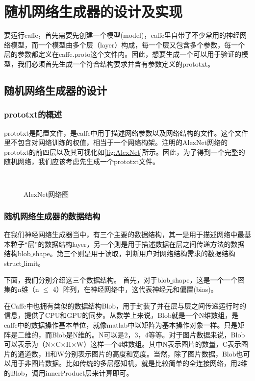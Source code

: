 ﻿\chapter{随机网络生成器的设计及实现}
要运行caffe，首先需要先创建一个模型(model)，caffe里自带了不少常用的神经网络模型，而一个模型由多个层（layer）构成，每一个层又包含多个参数，每一个层的参数都定义在caffe.proto这个文件内。因此，想要生成一个可以用于验证的模型，我们必须首先生成一个符合结构要求并含有参数定义的prototxt。
\section{随机网络生成器的设计}
\subsection{prototxt的概述}
prototxt是配置文件，是caffe中用于描述网络参数以及网络结构的文件。这个文件里不包含对网络训练的权值，相当于一个网络构架。注明的AlexNet网络的prototxt的前四层以及其可视化如\autoref{fig:AlexNet}所示。因此，为了得到一个完整的随机网络，我们应该考虑先生成一个prototxt文件。

\begin{figure}[!htbp]
\centering 
{}
\\
\caption{AlexNet网络图}
\label{fig:AlexNet}
\end{figure}

\subsection{随机网络生成器的数据结构}
在我们神经网络生成器当中，有三个主要的数据结构，其一是用于描述网络中最基本粒子“层”的数据结构layer，另一个则是用于描述数据在层之间传递方法的数据结构blob\underline{ }shape。第三个则是用于读取，判断用户对网络结构需求的数据结构struct\underline{ }limit。

下面，我们分别介绍这三个数据结构。
首先，对于blob\underline{ }shape，这是一个一个密集的n维（n $\leq$ 4）阵列，在神经网络中，这代表神经元和偏置(bias)。

在Caffe中也拥有类似的数据结构Blob，用于封装了并在层与层之间传递运行时的信息，提供了CPU和GPU的同步。从数学上来说，Blob就是一个N维数组，是caffe中的数据操作基本单位，就像matlab中以矩阵为基本操作对象一样。只是矩阵是二维的，而Blob是N维的。N可以是2，3，4等等。对于图片数据来说，Blob可以表示为（N$\times$C$\times$H$\times$W）这样一个4维数组。其中N表示图片的数量，C表示图片的通道数，H和W分别表示图片的高度和宽度。当然，除了图片数据，Blob也可以用于非图片数据。比如传统的多层感知机，就是比较简单的全连接网络，用2维的Blob，调用innerProduct层来计算即可。

